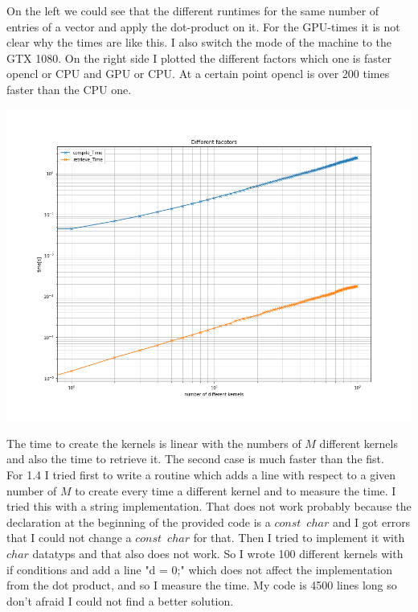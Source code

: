 \documentclass[11pt,a4paper]{article}
\begin{document}
\noindent
On the left we could see that the different runtimes for the same number of entries of a vector and apply the dot-product on it. For the GPU-times it is not clear why the times are like this. I also switch the mode of the machine to the GTX 1080. On the right side I plotted the different factors which one is faster opencl or CPU and GPU or CPU. At a certain point opencl is over 200 times faster than the CPU one.

\begin{center}
	\begin{minipage}[t]{0.49\textwidth}
		\includegraphics[width=\textwidth]{Bilder/Time_to_compile_and_clean}
	\end{minipage}
\end{center}

\noindent
The time to create the kernels is linear with the numbers of $M$ different kernels and also the time to retrieve it. The second case is much faster than the fist.\\
For 1.4 I tried first to write a routine which adds a line with respect to a given number of $M$ to create every time a different kernel and to measure the time. I tried this with a string implementation. That does not work probably because the declaration at the beginning of the provided code is a $const\,\,\,char$ and I got errors that I could not change a $const\,\,\,char$ for that. Then I tried to implement it with $char$ datatyps and that also does not work. So I wrote 100 different kernels with if conditions and add a line "d = 0;" which does not affect the implementation from the dot product, and so I measure the time. My code is 4500 lines long so don't afraid I could not find a better solution.
\end{document}
